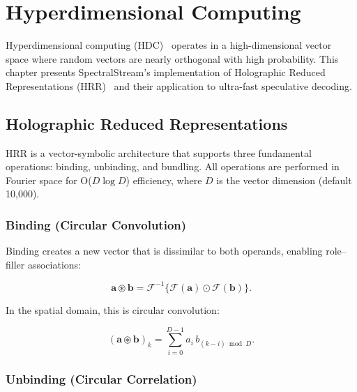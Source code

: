 \documentclass[11pt,a4paper,openright]{book}
\begin{document}
\chapter{Hyperdimensional Computing}
\label{ch:hdc}

Hyperdimensional computing (HDC)~\cite{kanerva2009hyperdimensional} operates in a high-dimensional vector space where random vectors are nearly orthogonal with high probability. This chapter presents SpectralStream's implementation of Holographic Reduced Representations (HRR)~\cite{plate2003holographic} and their application to ultra-fast speculative decoding.

\section{Holographic Reduced Representations}

HRR is a vector-symbolic architecture that supports three fundamental operations: binding, unbinding, and bundling. All operations are performed in Fourier space for O($D \log D$) efficiency, where $D$ is the vector dimension (default 10,000).

\subsection{Binding (Circular Convolution)}

Binding creates a new vector that is dissimilar to both operands, enabling role--filler associations:

\begin{equation}
	\label{eq:hrr_bind}
	\mathbf{a} \circledast \mathbf{b} = \mathcal{F}^{-1}\{\mathcal{F}(\mathbf{a}) \odot \mathcal{F}(\mathbf{b})\}.
\end{equation}

In the spatial domain, this is circular convolution:

\begin{equation}
	\label{eq:hrr_bind_spatial}
	(\mathbf{a} \circledast \mathbf{b})_k = \sum_{i=0}^{D-1} a_i \, b_{(k-i) \bmod D}.
\end{equation}

\subsection{Unbinding (Circular Correlation)}
\end{document}
